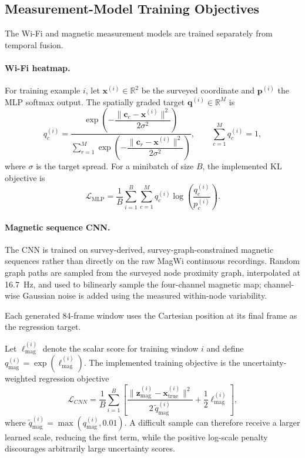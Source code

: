 \documentclass[conference]{IEEEtran}
\begin{document}
\subsection{Measurement-Model Training Objectives}

The Wi-Fi and magnetic measurement models are trained separately from temporal fusion.

\paragraph{Wi-Fi heatmap.}
For training example $i$, let $\mathbf{x}^{(i)}\in\mathbb{R}^2$ be the surveyed coordinate and $\mathbf{p}^{(i)}$ the MLP softmax output. The spatially graded target $\mathbf{q}^{(i)}\in\mathbb{R}^M$ is
\begin{equation}
q_c^{(i)}=
\frac{\exp\!\left(-\dfrac{\|\mathbf{c}_c-\mathbf{x}^{(i)}\|^2}{2\sigma^2}\right)}
{\displaystyle\sum_{r=1}^{M}\exp\!\left(-\dfrac{\|\mathbf{c}_r-\mathbf{x}^{(i)}\|^2}{2\sigma^2}\right)},
\qquad \sum_{c=1}^{M}q_c^{(i)}=1,
\label{eq:target_q}
\end{equation}
where $\sigma$ is the target spread. For a minibatch of size $B$, the implemented KL objective is
\begin{equation}
\mathcal{L}_{\mathrm{MLP}}
=\frac{1}{B}\sum_{i=1}^{B}\sum_{c=1}^{M}
q_c^{(i)}\log\!\left(\frac{q_c^{(i)}}{p_c^{(i)}}\right).
\label{eq:kl_loss}
\end{equation}

\paragraph{Magnetic sequence CNN.}
The CNN is trained on survey-derived, survey-graph-constrained magnetic sequences rather than directly on the raw MagWi continuous recordings. Random graph paths are sampled from the surveyed node proximity graph, interpolated at 16.7~Hz, and used to bilinearly sample the four-channel magnetic map; channel-wise Gaussian noise is added using the measured within-node variability.

Each generated 84-frame window uses the Cartesian position at its final frame as the regression target.

Let $\ell_{\mathrm{mag}}^{(i)}$ denote the scalar score for training window $i$ and define $q_{\mathrm{mag}}^{(i)}=\exp(\ell_{\mathrm{mag}}^{(i)})$. The implemented training objective is the uncertainty-weighted regression objective
\begin{equation}
\mathcal{L}_{CNN}=\frac{1}{B}\sum_{i=1}^{B}\left[
\frac{\|\mathbf{z}_{\mathrm{mag}}^{(i)}-\mathbf{x}_{\mathrm{true}}^{(i)}\|^2}{2\,\tilde q_{\mathrm{mag}}^{(i)}}
+\frac{1}{2}\ell_{\mathrm{mag}}^{(i)}\right],
\label{eq:nll_loss}
\end{equation}
where $\tilde q_{\mathrm{mag}}^{(i)}=\max(q_{\mathrm{mag}}^{(i)},0.01)$. A difficult sample can therefore receive a larger learned scale, reducing the first term, while the positive log-scale penalty discourages arbitrarily large uncertainty scores.
\end{document}
